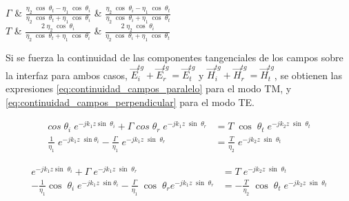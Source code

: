 \begin{table}
\begin{tabu}
		$\Gamma$
		&
		$\frac{\eta_2\; \cos\; \theta_t - \eta_1 \; \cos\; \theta_i}{\eta_2\; \cos\; \theta_t + \eta_1 \; \cos\; \theta_i}$
		&
		$\frac{\eta_2\; \cos\; \theta_i - \eta_1 \; \cos\; \theta_t}{\eta_2\; \cos\; \theta_i + \eta_1 \; \cos\; \theta_t}$
		\\
		$T$
		&
		$\frac{2 \;\eta_2 \; \cos\; \theta_i}{\eta_2\; \cos\; \theta_t + \eta_1 \; \cos\; \theta_i}$
		&
		$\frac{2\; \eta_2 \; \cos\; \theta_i}{\eta_2\; \cos\; \theta_i + \eta_1 \; \cos\; \theta_t}$
	\end{tabu}
	\caption{Campos incidentes, transmitidos y reflejados, y coeficientes de reflexión y transmisión para incidencia oblicua de una onda plana sobre una interfaz dieléctrica.}
	\label{table:incidencia_oblicua}
\end{table}

Si se fuerza la continuidad de las componentes tangenciales de los campos sobre la interfaz para ambos casos, $\vec{E}_i^{tg} + \vec{E}_r^{tg} = \vec{E}_t^{tg}$ y $\vec{H}_i^{tg} + \vec{H}_r^{tg} = \vec{H}_t^{tg}$, se obtienen las expresiones \ref{eq:continuidad_campos_paralelo} para el modo TM, y \ref{eq:continuidad_campos_perpendicular} para el modo TE.

\begin{equation}
	\begin{aligned}
		cos \; \theta_i \; e^{-j k_1 z \sin \; \theta_i} + \Gamma \; cos \; \theta_r \; e^{-j k_1 z \; \sin\; \theta_r} &= T\; \cos\; \theta_t \; e^{-j k_2 z \; \sin\; \theta_t}\\
		\frac{1}{\eta_1} \; e^{-j k_1 z \; \sin \theta_i} - \frac{\Gamma}{\eta_1} \; e^{-j k_1 z \; \sin \; \theta_r} &= \frac{T}{\eta_2} \; e^{-j k_2 z \; \sin\; \theta_t}
	\end{aligned}
	\label{eq:continuidad_campos_paralelo}
\end{equation}

\begin{equation}
	\begin{aligned}
		e^{-j k_1 z \sin \; \theta_i} + \Gamma \; e^{-j k_1 z \; \sin\; \theta_r} &= T\; e^{-j k_2 z \; \sin\; \theta_t}\\
		-\frac{1}{\eta_1} \cos\; \theta_i \; e^{-j k_1 z \; \sin \theta_i} - \frac{\Gamma}{\eta_1} \; \cos\; \theta_r e^{-j k_1 z \; \sin \; \theta_r} &= -\frac{T}{\eta_2} \; \cos\; \theta_t \; e^{-j k_2 z \; \sin\; \theta_t}
	\end{aligned}
	\label{eq:continuidad_campos_perpendicular}
\end{equation}

